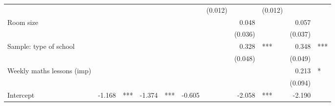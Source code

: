 \documentclass{article}
\begin{document}
\begin{table}[!h]
\begin{tabular}{lllllllllll}
  \multicolumn{1}{r}{} &
  \multicolumn{1}{l}{} &
  \multicolumn{1}{r}{} &
  \multicolumn{1}{l}{} &
  \multicolumn{1}{r}{} &
  \multicolumn{1}{l}{} &
  \multicolumn{1}{r}{(0.012)} &
  \multicolumn{1}{l}{} &
  \multicolumn{1}{r}{(0.012)} &
  \multicolumn{1}{l}{} \\
\multicolumn{1}{l}{Room size} &
  \multicolumn{1}{r}{} &
  \multicolumn{1}{l}{} &
  \multicolumn{1}{r}{} &
  \multicolumn{1}{l}{} &
  \multicolumn{1}{r}{} &
  \multicolumn{1}{l}{} &
  \multicolumn{1}{r}{0.048} &
  \multicolumn{1}{l}{} &
  \multicolumn{1}{r}{0.057} &
  \multicolumn{1}{l}{} \\
\multicolumn{1}{l}{} &
  \multicolumn{1}{r}{} &
  \multicolumn{1}{l}{} &
  \multicolumn{1}{r}{} &
  \multicolumn{1}{l}{} &
  \multicolumn{1}{r}{} &
  \multicolumn{1}{l}{} &
  \multicolumn{1}{r}{(0.036)} &
  \multicolumn{1}{l}{} &
  \multicolumn{1}{r}{(0.037)} &
  \multicolumn{1}{l}{} \\
\multicolumn{1}{l}{Sample: type of school} &
  \multicolumn{1}{r}{} &
  \multicolumn{1}{l}{} &
  \multicolumn{1}{r}{} &
  \multicolumn{1}{l}{} &
  \multicolumn{1}{r}{} &
  \multicolumn{1}{l}{} &
  \multicolumn{1}{r}{0.328} &
  \multicolumn{1}{l}{***} &
  \multicolumn{1}{r}{0.348} &
  \multicolumn{1}{l}{***} \\
\multicolumn{1}{l}{} &
  \multicolumn{1}{r}{} &
  \multicolumn{1}{l}{} &
  \multicolumn{1}{r}{} &
  \multicolumn{1}{l}{} &
  \multicolumn{1}{r}{} &
  \multicolumn{1}{l}{} &
  \multicolumn{1}{r}{(0.048)} &
  \multicolumn{1}{l}{} &
  \multicolumn{1}{r}{(0.049)} &
  \multicolumn{1}{l}{} \\
\multicolumn{1}{l}{Weekly maths lessons (imp)} &
  \multicolumn{1}{r}{} &
  \multicolumn{1}{l}{} &
  \multicolumn{1}{r}{} &
  \multicolumn{1}{l}{} &
  \multicolumn{1}{r}{} &
  \multicolumn{1}{l}{} &
  \multicolumn{1}{r}{} &
  \multicolumn{1}{l}{} &
  \multicolumn{1}{r}{0.213} &
  \multicolumn{1}{l}{*} \\
\multicolumn{1}{l}{} &
  \multicolumn{1}{r}{} &
  \multicolumn{1}{l}{} &
  \multicolumn{1}{r}{} &
  \multicolumn{1}{l}{} &
  \multicolumn{1}{r}{} &
  \multicolumn{1}{l}{} &
  \multicolumn{1}{r}{} &
  \multicolumn{1}{l}{} &
  \multicolumn{1}{r}{(0.094)} &
  \multicolumn{1}{l}{} \\
\multicolumn{1}{l}{Intercept} &
  \multicolumn{1}{r}{-1.168} &
  \multicolumn{1}{l}{***} &
  \multicolumn{1}{r}{-1.374} &
  \multicolumn{1}{l}{***} &
  \multicolumn{1}{r}{-0.605} &
  \multicolumn{1}{l}{} &
  \multicolumn{1}{r}{-2.058} &
  \multicolumn{1}{l}{***} &
  \multicolumn{1}{r}{-2.190} &

\end{tabular}
\end{table}
\end{document}

